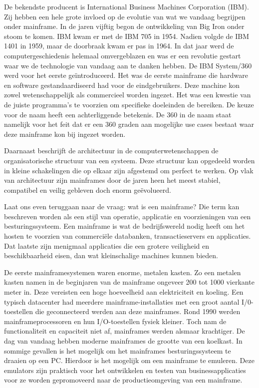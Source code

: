 De bekendste producent is International Business Machines Corporation (IBM). Zij hebben een hele grote invloed op de evolutie van wat we vandaag begrijpen onder mainframe. In de jaren vijftig begon de ontwikkeling van Big Iron onder stoom te komen. IBM kwam er met de IBM 705 in 1954. Nadien volgde de IBM 1401 in 1959, maar de doorbraak kwam er pas in 1964. In dat jaar werd de computergeschiedenis helemaal omvergeblazen en was er een revolutie gestart waar we de technologie van vandaag aan te danken hebben. De IBM System/360 werd voor het eerste geïntroduceerd. Het was de eerste mainframe die hardware en software gestandaardiseerd had voor de eindgebruikers. Deze machine kon zowel wetenschappelijk als commercieel worden ingezet. Het was een kwestie van de juiste programma's te voorzien om specifieke doeleinden de bereiken. De keuze voor de naam heeft een achterliggende betekenis. De 360 in de naam staat namelijk voor het feit dat er een 360 graden aan mogelijke use cases bestaat waar deze mainframe kon bij ingezet worden.

Daarnaast beschrijft de architectuur in de computerwetenschappen  de organisatorische structuur van een systeem. Deze structuur kan opgedeeld worden in kleine schakelingen die op elkaar zijn afgestemd om perfect te werken. Op vlak van architectuur zijn mainframes door de jaren heen het meest stabiel, compatibel en veilig gebleven doch enorm geëvolueerd. 

Laat ons even teruggaan naar de vraag: wat is een mainframe? Die term kan beschreven worden als een stijl van operatie, applicatie en voorzieningen van een besturingssysteem. Een mainframe is wat de bedrijfswereld nodig heeft om het hosten te voorzien van commerciële databanken, transactieservers en applicaties. Dat laatste zijn menigmaal applicaties die een grotere veiligheid en beschikbaarheid eisen, dan wat kleinschalige machines kunnen bieden. 

De eerste mainframesystemen waren enorme, metalen kasten. Zo een metalen kasten namen in de beginjaren van de mainframe ongeveer 200 tot 1000 vierkante meter in. Deze vereisten een hoge hoeveelheid aan elektriciteit en koeling. Een typisch datacenter had meerdere mainframe-installaties met een groot aantal I/0-toestellen die geconnecteerd werden aan deze mainframes. Rond 1990 werden mainframeprocessoren en hun I/O-toestellen fysiek kleiner. Toch nam de functionaliteit en capaciteit niet af, mainframes werden alsmaar krachtiger. De dag van vandaag hebben moderne mainframes de grootte van een koelkast. In sommige gevallen is het mogelijk om het mainframes besturingssysteem te draaien op een PC. Hierdoor is het mogelijk om een mainframe te emuleren. Deze emulators zijn praktisch voor het ontwikkelen en testen van businessapplicaties voor ze worden gepromoveerd naar de productieomgeving van een mainframe. 

